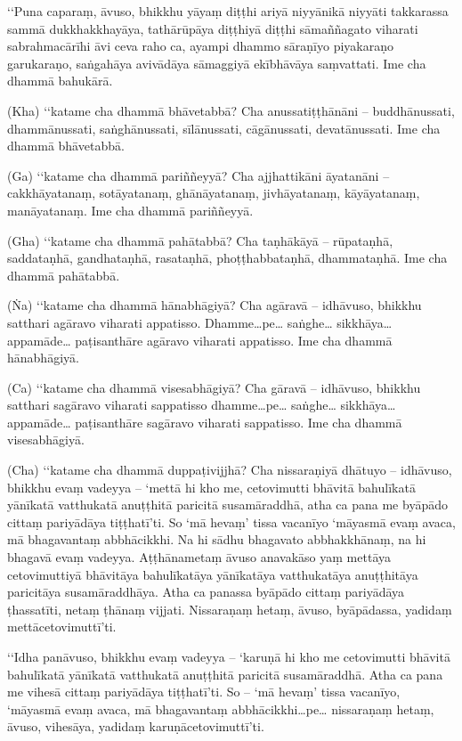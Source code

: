 ‘‘Puna caparaṃ, āvuso, bhikkhu yāyaṃ diṭṭhi ariyā niyyānikā niyyāti takkarassa sammā dukkhakkhayāya, tathārūpāya diṭṭhiyā diṭṭhi sāmaññagato viharati sabrahmacārīhi āvi ceva raho ca, ayampi dhammo sāraṇīyo piyakaraṇo garukaraṇo, saṅgahāya avivādāya sāmaggiyā ekībhāvāya saṃvattati. Ime cha dhammā bahukārā.

(Kha) ‘‘katame cha dhammā bhāvetabbā? Cha anussatiṭṭhānāni – buddhānussati, dhammānussati, saṅghānussati, sīlānussati, cāgānussati, devatānussati. Ime cha dhammā bhāvetabbā.

(Ga) ‘‘katame cha dhammā pariññeyyā? Cha ajjhattikāni āyatanāni – cakkhāyatanaṃ, sotāyatanaṃ, ghānāyatanaṃ, jivhāyatanaṃ, kāyāyatanaṃ, manāyatanaṃ. Ime cha dhammā pariññeyyā.

(Gha) ‘‘katame cha dhammā pahātabbā? Cha taṇhākāyā – rūpataṇhā, saddataṇhā, gandhataṇhā, rasataṇhā, phoṭṭhabbataṇhā, dhammataṇhā. Ime cha dhammā pahātabbā.

(Ṅa) ‘‘katame cha dhammā hānabhāgiyā? Cha agāravā – idhāvuso, bhikkhu satthari agāravo viharati appatisso. Dhamme…pe… saṅghe… sikkhāya… appamāde… paṭisanthāre agāravo viharati appatisso. Ime cha dhammā hānabhāgiyā.

(Ca) ‘‘katame cha dhammā visesabhāgiyā? Cha gāravā – idhāvuso, bhikkhu satthari sagāravo viharati sappatisso dhamme…pe… saṅghe… sikkhāya… appamāde… paṭisanthāre sagāravo viharati sappatisso. Ime cha dhammā visesabhāgiyā.

(Cha) ‘‘katame cha dhammā duppaṭivijjhā? Cha nissaraṇiyā dhātuyo – idhāvuso, bhikkhu evaṃ vadeyya – ‘mettā hi kho me, cetovimutti bhāvitā bahulīkatā yānīkatā vatthukatā anuṭṭhitā paricitā susamāraddhā, atha ca pana me byāpādo cittaṃ pariyādāya tiṭṭhatī’ti. So ‘mā hevaṃ’ tissa vacanīyo ‘māyasmā evaṃ avaca, mā bhagavantaṃ abbhācikkhi. Na hi sādhu bhagavato abbhakkhānaṃ, na hi bhagavā evaṃ vadeyya. Aṭṭhānametaṃ āvuso anavakāso yaṃ mettāya cetovimuttiyā bhāvitāya bahulīkatāya yānīkatāya vatthukatāya anuṭṭhitāya paricitāya susamāraddhāya. Atha ca panassa byāpādo cittaṃ pariyādāya ṭhassatīti, netaṃ ṭhānaṃ vijjati. Nissaraṇaṃ hetaṃ, āvuso, byāpādassa, yadidaṃ mettācetovimuttī’ti.

‘‘Idha panāvuso, bhikkhu evaṃ vadeyya – ‘karuṇā hi kho me cetovimutti bhāvitā bahulīkatā yānīkatā vatthukatā anuṭṭhitā paricitā susamāraddhā. Atha ca pana me vihesā cittaṃ pariyādāya tiṭṭhatī’ti. So – ‘mā hevaṃ’ tissa vacanīyo, ‘māyasmā evaṃ avaca, mā bhagavantaṃ abbhācikkhi…pe… nissaraṇaṃ hetaṃ, āvuso, vihesāya, yadidaṃ karuṇācetovimuttī’ti.

